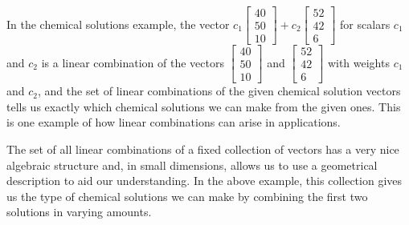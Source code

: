 In the chemical solutions example, the vector $c_1\left[ \begin{array}{c} 40\\50\\10\end{array} \right]+ c_2\left[ \begin{array}{c} 52\\42\\6\end{array} \right]$ for scalars $c_1$ and $c_2$ is a linear combination of the vectors $\left[ \begin{array}{c} 40\\50\\10\end{array} \right]$ and $\left[ \begin{array}{c} 52\\42\\6\end{array} \right]$ with weights $c_1$ and $c_2$, and the set of linear combinations of the given chemical solution vectors tells us exactly which chemical solutions we can make from the given ones. This is one example of how linear combinations can arise in applications.  

The set of all linear combinations of a fixed collection of vectors has a very nice algebraic structure and, in small dimensions, allows us to use a geometrical description to aid our understanding. In the above example, this collection gives us the type of chemical solutions we can make by combining the first two solutions in varying amounts. 

